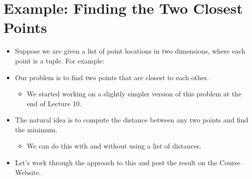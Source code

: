 \documentclass[letterpaper,10pt,english]{sphinxmanual}
\begin{document}
\section{Example: Finding the Two Closest Points}
\label{\detokenize{lecture_notes/lec12_loops2_for_double:example-finding-the-two-closest-points}}\begin{itemize}
\item {} 
Suppose we are given a list of point locations in two dimensions,
where each point is a tuple. For example:

\begin{sphinxVerbatim}[commandchars=\\\{\}]
  \PYG{p}{[}         \PYG{p}{]}
\end{sphinxVerbatim}

\item {} 
Our problem is to find two points that are closest to each
other.
\begin{itemize}
\item {} 
We started working on a slightly simpler version of this problem
at the end of Lecture 10.

\end{itemize}

\item {} 
The natural idea is to compute the distance between any two points
and find the minimum.
\begin{itemize}
\item {} 
We can do this with and without using a list of distances.

\end{itemize}

\item {} 
Let’s work through the approach to this and post the result on the
Course Website.

\end{itemize}
\end{document}
